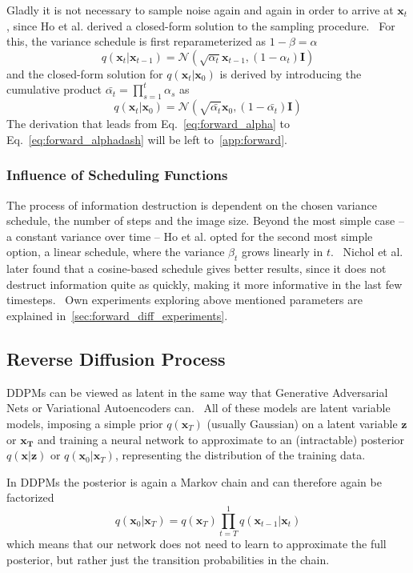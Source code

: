 Gladly it is not necessary to sample noise again and again in order to arrive at $\bm{x}_t$, since Ho et al. derived a closed-form solution to the sampling procedure.~\autocite{ho2020denoising} For this, the variance schedule is first reparameterized as $1-\beta = \alpha$
\begin{equation}
    q(\bm{x}_t | \bm{x}_{t-1}) = \mathcal{N}(\sqrt{\alpha_t} \bm{x}_{t-1}, (1-\alpha_t) \bm{I})
    \label{eq:forward_alpha}
\end{equation}
and the closed-form solution for $q(\bm{x}_t|\bm{x}_0)$ is derived by introducing the cumulative product $\bar{\alpha_t} = \prod_{s=1}^{t}\alpha_s$ as
\begin{equation}
    q(\bm{x}_t|\bm{x}_0) = \mathcal{N}(\sqrt{\bar{\alpha_t}}\bm{x}_0, (1-\bar{\alpha_t})\bm{I})
    \label{eq:forward_alphadash}
\end{equation}
The derivation that leads from Eq.~\ref{eq:forward_alpha} to Eq.~\ref{eq:forward_alphadash} will be left to~\ref{app:forward}.

\subsubsection{Influence of Scheduling Functions}
The process of information destruction is dependent on the chosen variance schedule, the number of steps and the image size. Beyond the most simple case -- a constant variance over time -- Ho et al. opted for the second most simple option, a linear schedule, where the variance $\beta_t$ grows linearly in $t$.~\autocite{ho2020denoising} Nichol et al. later found that a cosine-based schedule gives better results, since it does not destruct information quite as quickly, making it more informative in the last few timesteps.~\autocite{nichol2021improved} Own experiments exploring above mentioned parameters are explained in~\ref{sec:forward_diff_experiments}.

\subsection{Reverse Diffusion Process}
DDPMs can be viewed as latent in the same way that Generative Adversarial Nets or Variational Autoencoders can.~\autocite{goodfellow2014generative,kingma2022autoencoding} All of these models are latent variable models, imposing a simple prior $q(\bm{x}_T)$ (usually Gaussian) on a latent variable $\bm{z}$ or $\bm{x_T}$ and training a neural network to approximate to an (intractable) posterior $q(\bm{x}|\bm{z})$ or $q(\bm{x}_0|\bm{x}_T)$, representing the distribution of the training data.

In DDPMs the posterior is again a Markov chain and can therefore again be factorized
\begin{equation}
    q(\bm{x}_0|\bm{x}_T) = q(\bm{x}_T) \prod_{t=T}^{1} q(\bm{x}_{t-1}|\bm{x}_{t})
\end{equation}
which means that our network does not need to learn to approximate the full posterior, but rather just the transition probabilities in the chain.